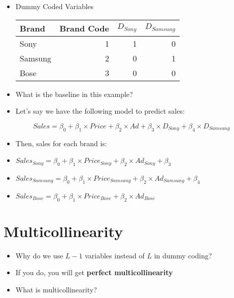 \documentclass[10pt,article]{article}
\begin{document}
\begin{itemize}
\item Dummy Coded Variables

\begin{center}
\begin{tabular}{lrrr}
Brand & Brand Code & \(D_{Sony}\) & \(D_{Samsung}\)\\
\hline
Sony & 1 & 1 & 0\\
Samsung & 2 & 0 & 1\\
Bose & 3 & 0 & 0\\
\end{tabular}
\end{center}

\item What is the baseline in this example?
\end{itemize}

\begin{itemize}
\item Let’s say we have the following model to predict sales:
\end{itemize}

\[  Sales = \beta_0 + \beta_1 \times Price + \beta_2 \times Ad + \beta_3 \times
D_{Sony}  + \beta_4 \times D_{Samsung} \]


\begin{itemize}
\item Then, sales for each brand is:
\end{itemize}

\begin{itemize}
\item \(Sales_{Sony} = \beta_0 + \beta_1 \times Price_{Sony} + \beta_2 \times Ad_{Sony} + \beta_3\)
\item \(Sales_{Samsung} = \beta_0 + \beta_1 \times Price_{Samsung} + \beta_2 \times Ad_{Samsung} + \beta_4\)
\item \(Sales_{Bose} = \beta_0 + \beta_1 \times Price_{Bose} + \beta_2 \times Ad_{Bose}\)
\end{itemize}
\section{Multicollinearity}
\label{sec:org7d55df3}
\begin{itemize}
\item Why do we use \(L-1\) variables instead of \(L\) in dummy coding?

\item If you do, you will get \textbf{perfect multicollinearity}

\item What is multicollinearity?
\end{itemize}
\end{document}
